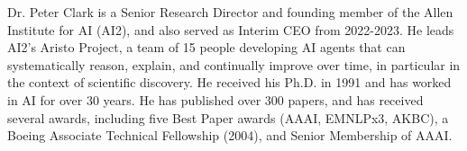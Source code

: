Dr. Peter Clark is a Senior Research Director and founding member of the Allen Institute for AI (AI2), and also served as Interim CEO from 2022-2023. He leads AI2's Aristo Project, a team of 15 people developing AI agents that can systematically reason, explain, and continually improve over time, in particular in the context of scientific discovery. He received his Ph.D. in 1991 and has worked in AI for over 30 years. He has published over 300 papers, and has received several awards, including five Best Paper awards (AAAI, EMNLPx3, AKBC), a Boeing Associate Technical Fellowship (2004), and Senior Membership of AAAI.